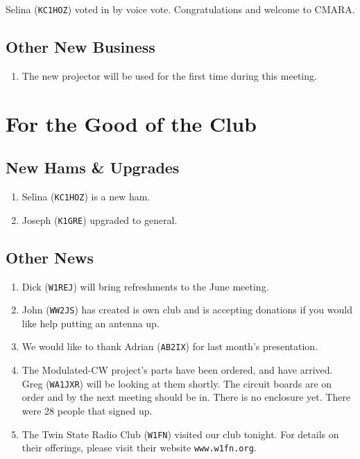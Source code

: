 \documentclass[10pt,letterpaper]{article}
\begin{document}
Selina (\texttt{KC1HOZ}) voted in by voice vote. Congratulations and welcome to CMARA.

\subsection{Other New Business}
\begin{enumerate}
  \item The new projector will be used for the first time during this meeting.
\end{enumerate}

\section{For the Good of the Club}

\subsection{New Hams \& Upgrades}
\begin{enumerate}
  \item Selina (\texttt{KC1HOZ}) is a new ham.
  \item Joseph (\texttt{K1GRE}) upgraded to general.
\end{enumerate}

\subsection{Other News}
\begin{enumerate}
  \item Dick (\texttt{W1REJ}) will bring refreshments to the June meeting.
  \item John (\texttt{WW2JS}) has created is own club and is accepting donations if you would like help putting an antenna up.
  \item We would like to thank Adrian (\texttt{AB2IX}) for last month's presentation.
  \item The Modulated-CW project's parts have been ordered, and have arrived. Greg (\texttt{WA1JXR}) will be looking at them shortly. The circuit boards are on order and by the next meeting should be in. There is no enclosure yet. There were 28 people that signed up.
  \item The Twin State Radio Club (\texttt{W1FN}) visited our club tonight. For details on their offerings, please visit their website \texttt{www.w1fn.org}.
\end{enumerate}
\end{document}
